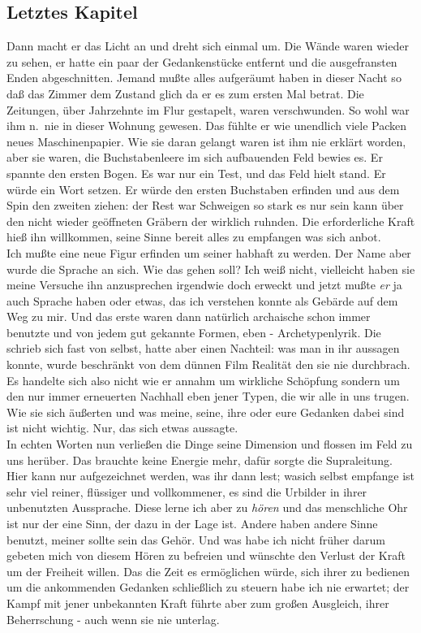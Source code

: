 \documentclass[
]{article}
\author{}
\date{\vspace{-2.5em}}
\begin{document}
\subsection{Letztes Kapitel}\label{letztes-kapitel}

Dann macht er das Licht an und dreht sich einmal um. Die Wände waren
wieder zu sehen, er hatte ein paar der Gedankenstücke entfernt und die
ausgefransten Enden abgeschnitten. Jemand mußte alles aufgeräumt haben
in dieser Nacht so daß das Zimmer dem Zustand glich da er es zum ersten
Mal betrat. Die Zeitungen, über Jahrzehnte im Flur gestapelt, waren
verschwunden. So wohl war ihm n.~nie in dieser Wohnung gewesen. Das
fühlte er wie unendlich viele Packen neues Maschinenpapier. Wie sie
daran gelangt waren ist ihm nie erklärt worden, aber sie waren, die
Buchstabenleere im sich aufbauenden Feld bewies es. Er spannte den
ersten Bogen. Es war nur ein Test, und das Feld hielt stand. Er würde
ein Wort setzen. Er würde den ersten Buchstaben erfinden und aus dem
Spin den zweiten ziehen: der Rest war Schweigen so stark es nur sein
kann über den nicht wieder geöffneten Gräbern der wirklich ruhnden. Die
erforderliche Kraft hieß ihn willkommen, seine Sinne bereit alles zu
empfangen was sich anbot.\\
Ich mußte eine neue Figur erfinden um seiner habhaft zu werden. Der Name
aber wurde die Sprache an sich. Wie das gehen soll? Ich weiß nicht,
vielleicht haben sie meine Versuche ihn anzusprechen irgendwie doch
erweckt und jetzt mußte \emph{er} ja auch Sprache haben oder etwas, das
ich verstehen konnte als Gebärde auf dem Weg zu mir. Und das erste waren
dann natürlich archaische schon immer benutzte und von jedem gut
gekannte Formen, eben - Archetypenlyrik. Die schrieb sich fast von
selbst, hatte aber einen Nachteil: was man in ihr aussagen konnte, wurde
beschränkt von dem dünnen Film Realität den sie nie durchbrach. Es
handelte sich also nicht wie er annahm um wirkliche Schöpfung sondern um
den nur immer erneuerten Nachhall eben jener Typen, die wir alle in uns
trugen. Wie sie sich äußerten und was meine, seine, ihre oder eure
Gedanken dabei sind ist nicht wichtig. Nur, das sich etwas aussagte.\\
In echten Worten nun verließen die Dinge seine Dimension und flossen im
Feld zu uns herüber. Das brauchte keine Energie mehr, dafür sorgte die
Supraleitung. Hier kann nur aufgezeichnet werden, was ihr dann lest;
wasich selbst empfange ist sehr viel reiner, flüssiger und vollkommener,
es sind die Urbilder in ihrer unbenutzten Aussprache. Diese lerne ich
aber zu \emph{hören} und das menschliche Ohr ist nur der eine Sinn, der
dazu in der Lage ist. Andere haben andere Sinne benutzt, meiner sollte
sein das Gehör. Und was habe ich nicht früher darum gebeten mich von
diesem Hören zu befreien und wünschte den Verlust der Kraft um der
Freiheit willen. Das die Zeit es ermöglichen würde, sich ihrer zu
bedienen um die ankommenden Gedanken schließlich zu steuern habe ich nie
erwartet; der Kampf mit jener unbekannten Kraft führte aber zum großen
Ausgleich, ihrer Beherrschung - auch wenn sie nie unterlag.
\end{document}
